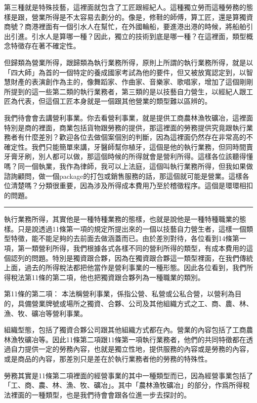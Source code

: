 \documentclass[oneside,sub3section]{ctexbook}
\begin{document}
第三種就是特殊技藝，這裡面就包含了工匠跟經紀人。這種獨立勞而這種勞務的態樣是跟，營業所得是不太容易去劃分的。像是，修鞋的師傅，算工匠，還是算獨資商號？商港裡面有一個引水人在幫忙，在外國輪船，要進港出港的時候，將船舶引出引進。引水人是算哪一種？因此，獨立的技術到底是哪一種？在這裡面，類型概念特徵存在著不確定性。

但歸類為營業所得，跟歸類為執行業務所得，原則上所謂的執行業務所得，就是以「四大師」為首的一個特定的養成國家考試為他的要件，但又被放寬認定到，以智慧財產的表演創作為主的，像舞蹈家、作曲家、音樂家、歌唱家，增加了這個剛剛所提到的這一些第二類的執行業務者，第三類的是以技藝自力營生，以經紀人跟工匠為代表，但這個工匠本身就是一個跟其他營業的類型難以區辨的。

我們待會會去講營利事業。你去看營利事業，就是提供工商農林漁牧礦冶，這裡面特別是商的裡面，商業包括貨物跟勞務的提供，那這裡面的勞務提供究竟跟執行業務者有什麼差別？歡迎各位去做個案個別的判斷，因為這裡面仍然存在非常高的不確定性。我們只能簡單來講，牙醫師幫你植牙，這個是他的執行業務，但同時間賣牙膏牙刷，別人都可以做，那這個時候的所得就會是營利所得。這樣各位該聽得懂嗎？同一個執業，我作為律師，我可以上法庭，這個叫執行業務所得，但我如果做諮詢顧問，做一個package的打包或銷售服務的話，那這個就可能是營業。這樣各位清楚嗎？分類很重要，因為涉及所得成本費用乃至於稽徵程序。這個是環環相扣的問題。

\begin{center}\rule{0.5\linewidth}{0.5pt}\end{center}

執行業務所得，其實他是一種特種業務的態樣，也就是說他是一種特種職業的態樣。只是說透過11條第一項的規定所提出來的一個以技藝自力營生者，這樣一個類型特徵，能不能足夠的去前面去做涵蓋而已。由於差別對待，各位看到14條第一項，第一類營利所得，我們根據各式各樣不同的營利所得的類型，有成本費用的這個認列的問題。特別是獨資跟合夥，因為在獨資跟合夥這一類型裡面，在我們傳統上面，過去的所得稅法都把他當作是營利事業的一種形態。因此各位看到，我們所得稅法第11條的第二項，他也把獨資跟合夥列為一種職業的類別。

第11條的第二項：
本法稱營利事業，係指公營、私營或公私合營，以營利為目的，具備營業牌號或場所之獨資、合夥、公司及其他組織方式之工、商、農、林、漁、牧、礦冶等營利事業。

組織型態，包括了獨資合夥公司跟其他組織方式都在內。營業的內容包括了工商農林漁牧礦冶等。因此11條第二項跟11條第一項執行業務者，他們的共同特徵都在透過自力提供一定的勞務內容，也就是獨立性地，提供服務的內容或是勞務的內容，或是商品的內容，那差別只是差在於執行業務者他的勞務的特殊性。

勞務其實是11條第二項裡面的經營事業的其中一種類型而已，因為經營事業包括了「工、商、農、林、漁、牧、礦冶」。其中「農林漁牧礦冶」的部分，作爲所得稅法裡面的一種類型，也是我們待會會跟各位進一步去探討的。
\end{document}
